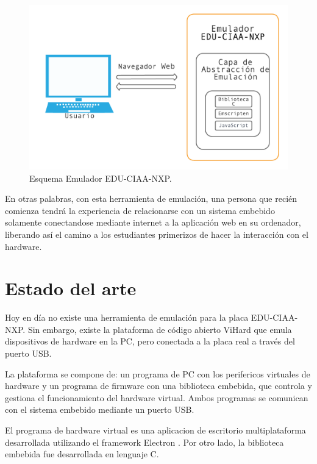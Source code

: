 \begin{figure}[ht]
	\centering
	\includegraphics[scale=.60]{./Figures/EsquemaEmulador.png}
	\caption{Esquema Emulador EDU-CIAA-NXP.}
	\label{fig:EsquemaEmulador}
\end{figure}

En otras palabras, con esta herramienta de emulación, una persona que recién comienza tendrá la experiencia de relacionarse con un sistema embebido solamente conectandose mediante internet a la aplicación web en su ordenador, liberando así el camino a los estudiantes primerizos de hacer la interacción con el hardware.

\section{Estado del arte}

Hoy en día no existe una herramienta de emulación para la placa EDU-CIAA-NXP. Sin embargo, existe la plataforma de código abierto ViHard \citep{ViHard} que emula dispositivos de hardware en la PC, pero conectada a la placa real a través del puerto USB. 

La plataforma se compone de: un programa de PC con los perifericos virtuales de hardware y un programa de firmware con una biblioteca embebida, que controla y gestiona el funcionamiento del hardware virtual. Ambos programas se comunican con el sistema embebido mediante un puerto USB.

El programa de hardware virtual es una aplicacion de escritorio multiplataforma desarrollada utilizando el framework Electron \citep{Electron}. Por otro lado, la biblioteca embebida fue desarrollada en lenguaje C. 

